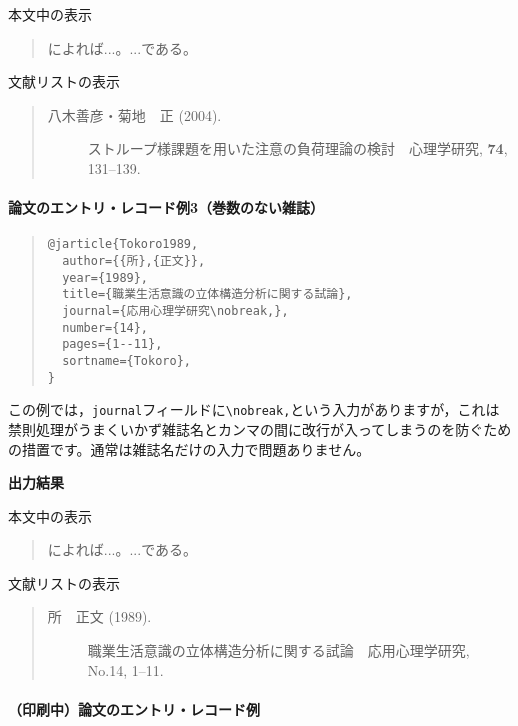 \documentclass[12pt]{ltjsarticle}
\begin{document}
本文中の表示
\begin{quote}
\textcite{Yagi2004}によれば...。...である\parencite{Yagi2004}。
\end{quote}


文献リストの表示
\begin{quote}
\begin{description}
  \item[\textrm{八木善彦・菊地　正 (2004).}]ストループ様課題を用いた注意の負荷理論の検討　心理学研究, \textbf{74}, 131--139.
\end{description}
\end{quote}

\paragraph{論文のエントリ・レコード例3（巻数のない雑誌）}

\begin{quote}
\begin{verbatim}
@jarticle{Tokoro1989,
  author={{所},{正文}},
  year={1989},
  title={職業生活意識の立体構造分析に関する試論},
  journal={応用心理学研究\nobreak,},
  number={14},
  pages={1--11},
  sortname={Tokoro},
}
\end{verbatim}
\end{quote}

この例では，\texttt{journal}フィールドに\texttt{\textbackslash nobreak,}という入力がありますが，これは禁則処理がうまくいかず雑誌名とカンマの間に改行が入ってしまうのを防ぐための措置です。通常は雑誌名だけの入力で問題ありません。

\textbf{出力結果}

本文中の表示
\begin{quote}
\textcite{Tokoro1989}によれば...。...である\parencite{Tokoro1989}。
\end{quote}


文献リストの表示
\begin{quote}
\begin{description}
  \item[\textrm{所　正文 (1989).}]職業生活意識の立体構造分析に関する試論　応用心理学研究, No.14, 1--11.
\end{description}
\end{quote}


\paragraph{（印刷中）論文のエントリ・レコード例}　
\end{document}
